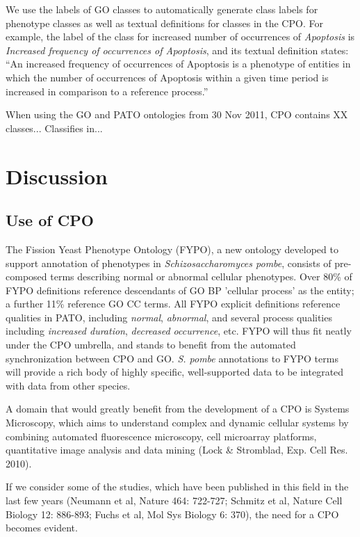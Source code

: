 \documentclass{bioinfo}
\begin{document}
We use the labels of GO classes to automatically generate class labels
for phenotype classes as well as textual definitions for classes in
the CPO. For example, the label of the class for increased number of
occurrences of {\em Apoptosis} is {\em Increased frequency of
  occurrences of Apoptosis}, and its textual definition states: ``An
increased frequency of occurrences of Apoptosis is a phenotype of
entities in which the number of occurrences of Apoptosis within a
given time period is increased in comparison to a reference process.''

When using the GO and PATO ontologies from 30 Nov 2011, CPO contains
XX classes...
Classifies in...

\section{Discussion}
\subsection{Use of CPO}
The Fission Yeast Phenotype Ontology (FYPO), a new ontology developed
to support annotation of phenotypes in {\em Schizosaccharomyces
  pombe}, consists of pre-composed terms describing normal or abnormal
cellular phenotypes. Over 80\% of FYPO definitions reference
descendants of GO BP 'cellular process' as the entity; a further 11\%
reference GO CC terms. All FYPO explicit definitions reference
qualities in PATO, including {\em normal}, {\em abnormal}, and several
process qualities including {\em increased duration}, {\em decreased
  occurrence}, etc. FYPO will thus fit neatly under the CPO umbrella,
and stands to benefit from the automated synchronization between CPO
and GO. {\em S. pombe} annotations to FYPO terms will provide a rich
body of highly specific, well-supported data to be integrated with
data from other species.

A domain that would greatly benefit from the development of a CPO is
Systems Microscopy, which aims to understand complex and dynamic
cellular systems by combining automated fluorescence microscopy, cell
microarray platforms, quantitative image analysis and data mining
(Lock \& Stromblad, Exp. Cell Res. 2010).

If we consider some of the studies, which have been published in this
field in the last few years (Neumann et al, Nature 464: 722-727;
Schmitz et al, Nature Cell Biology 12: 886-893; Fuchs et al, Mol Sys
Biology 6: 370), the need for a CPO becomes evident.
\end{document}
